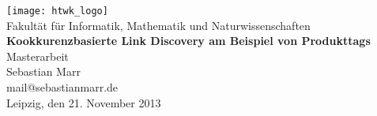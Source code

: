 \thispagestyle{plain}
\begin{titlepage}
\begin{center}
\texttt{[image: htwk\_logo]}\\
\vspace{0.3cm}
\normalsize
Fakultät für Informatik, Mathematik und Naturwissenschaften\\
\vspace{3cm}
\huge{\textbf{\textsf{Kookkurenzbasierte Link Discovery am Beispiel von Produkttags}}}\\
\vspace{1cm}
\LARGE{\textsf{Masterarbeit}}\\
\vspace{3cm}
\normalsize
Sebastian Marr\\
mail@sebastianmarr.de\\
\vspace{3cm}
Leipzig, den 21. November 2013
\end{center}
\end{titlepage}